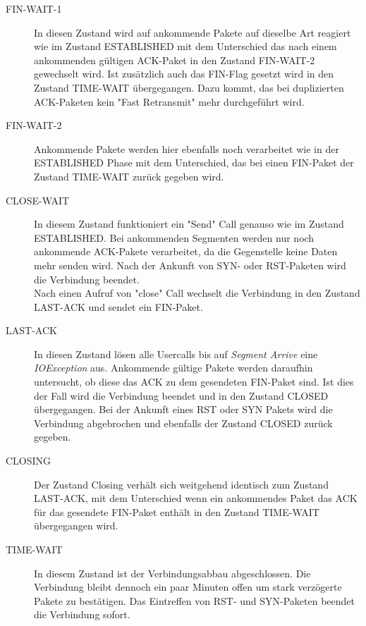 \begin{description}
\item[FIN-WAIT-1]

In diesen Zustand wird auf ankommende Pakete auf dieselbe Art reagiert wie im Zustand ESTABLISHED mit dem Unterschied das nach einem ankommenden gültigen ACK-Paket in den Zustand FIN-WAIT-2 gewechselt wird. Ist zusätzlich auch das FIN-Flag gesetzt wird in den Zustand TIME-WAIT übergegangen. Dazu kommt, das bei duplizierten ACK-Paketen kein {}"Fast Retransmit"{} mehr durchgeführt wird.

\item[FIN-WAIT-2]	
Ankommende Pakete werden hier ebenfalls noch verarbeitet wie in der ESTABLISHED Phase mit dem Unterschied, das bei einen FIN-Paket der Zustand TIME-WAIT zurück gegeben wird.


\item[CLOSE-WAIT]

In diesem Zustand funktioniert ein "{}Send"{} Call genauso wie im Zustand ESTABLISHED. Bei ankommenden Segmenten werden nur noch ankommende ACK-Pakete verarbeitet, da die Gegenstelle keine Daten mehr senden wird. Nach der Ankunft von SYN- oder RST-Paketen wird die Verbindung beendet. \\
Nach einen Aufruf von {}"close"{} Call wechselt die Verbindung in den Zustand LAST-ACK und sendet ein FIN-Paket.

\item[LAST-ACK]

In diesen Zustand lösen alle Usercalls bis auf \textit{Segment Arrive} eine \textit{IOException} aus. Ankommende gültige Pakete werden daraufhin untersucht, ob diese das ACK zu dem gesendeten FIN-Paket sind. Ist dies der Fall wird die Verbindung beendet und in den Zustand CLOSED übergegangen. Bei der Ankunft eines RST oder SYN Pakets wird die Verbindung abgebrochen und ebenfalls der Zustand CLOSED zurück gegeben.

\item[CLOSING]

Der Zustand Closing verhält sich weitgehend identisch zum Zustand LAST-ACK, mit dem Unterschied wenn ein ankommendes Paket das ACK für das gesendete FIN-Paket enthält in den Zustand TIME-WAIT übergegangen wird.


\item[TIME-WAIT]
In diesem Zustand ist der Verbindungsabbau abgeschlossen. Die Verbindung bleibt dennoch ein paar Minuten offen um stark verzögerte Pakete zu bestätigen. Das Eintreffen von RST- und SYN-Paketen beendet die Verbindung sofort.

\end{description}

